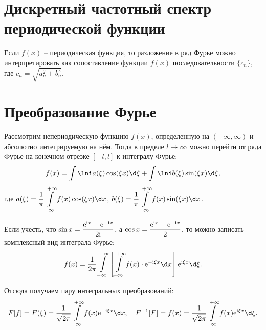 \section{Дискретный частотный спектр периодической функции}
Если \( f(x) \) -- периодическая функция, то разложение в ряд Фурье можно
интерпретировать как сопоставление функции \( f(x) \) последовательности
\( \{c_n\} \), где \( c_n = \sqrt{a_n^2 + b_n^2} \).

\section{Преобразование Фурье}
Рассмотрим непериодическую функцию \( f(x) \), определенную на \( (-\infty,
\infty) \) и абсолютно интегрируемую на нём. Тогда в пределе \( l \to \infty \)
можно перейти от ряда Фурье на конечном отрезке \( [-l, l] \) к интегралу Фурье:
\[
    f(x) = \int\lni a(\xi)\cos(\xi x)\d\xi + \int\lni b(\xi)\sin(\xi x)\d\xi,
\]
где \( \ds a(\xi) = \frac{1}{\pi} \int\limits_{-\infty}^{+\infty}
f(x)\cos(\xi x)\d x \), \( \ds b(\xi) = \frac{1}{\pi}
\int\limits_{-\infty}^{+\infty} f(x)\sin(\xi x)\d x \).

Если учесть, что \( \displaystyle \sin x = \frac{\mathrm{e}^{\mathrm{i} x} - \mathrm{e}^{-\mathrm{i} x}}{2\mathrm{i}} \), а
\( \displaystyle \cos x = \frac{\mathrm{e}^{\mathrm{i} x} + \mathrm{e}^{-\mathrm{i} x}}{2} \), то можно записать
комплексный вид интеграла Фурье:
\[
    f(x) = \frac{1}{2\pi}\int\limits_{-\infty}^{+\infty} \left[
    \int\limits_{-\infty}^{+\infty} f(x)\cdot\e^{-\i\xi x}\d x\right]
    \e^{\i\xi x}\d\xi.
\]

Отсюда получаем пару интегральных преобразований:
\[
    F[f] = F(\xi) = \frac{1}{\sqrt{2\pi}}\int\limits_{-\infty}^{+\infty} f(x)
    \e^{-\i\xi x}\d x, \quad
    F^{-1}[F] = f(x) = \frac{1}{\sqrt{2\pi}}\int\limits_{-\infty}^{+\infty} f(x)
    \e^{\i\xi x}\d\xi.
\]
\newpage
